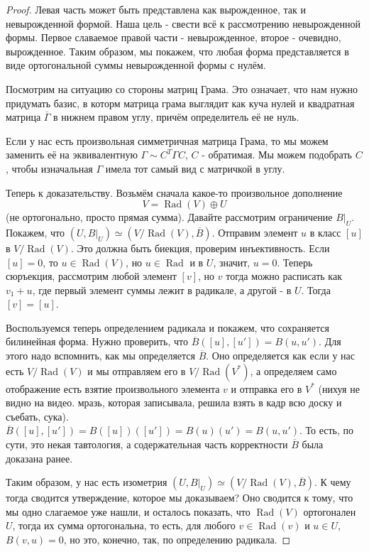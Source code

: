 \documentclass[a4paper,100pt]{article}
\theoremstyle{indented}
\theoremstyle{definition}
\theoremstyle{remark}
\DeclareMathOperator{\Rad}{Rad}
\begin{document}
\begin{proof}
    Левая часть может быть представлена как вырожденное, так и невырожденной формой. Наша цель - свести всё к рассмотрению невырожденной формы. Первое славаемое правой части - невырожденное, второе - очевидно, вырожденное. Таким образом, мы покажем, что любая форма представляется в виде ортогональной суммы невырожденной формы с нулём.

    Посмотрим на ситуацию со стороны матриц Грама. Это означает, что нам нужно придумать базис, в которм матрица грама выглядит как куча нулей и квадратная матрица $\overline{\Gamma}$ в нижнем правом углу, причём определитель её не нуль. \ 

    Если у нас есть произвольная симметричная матрица Грама, то мы можем заменить её на эквивалентную $\Gamma \sim C^T\Gamma C$, $C$ - обратимая. Мы можем подобрать $C$, чтобы изначальная $\Gamma$ имела тот самый вид с матричкой в углу. \ 

    Теперь к доказательству. Возьмём сначала какое-то произвольное дополнение 
    \[
        V = \Rad(V)\oplus U
    \]
    (не ортогонально, просто прямая сумма). Давайте рассмотрим ограничение $B\bigg|_U$. Покажем, что $(U, B\bigg|_U)\simeq (V/\Rad(V), \overline{B})$. Отправим элемент $u$ в класс $[u]$ в $V/\Rad(V)$. Это должна быть биекция, проверим инъективность. Если $[u]=0$, то $u\in\Rad(V)$, но $u\in \Rad$ и в $U$, значит, $u=0$. Теперь сюръекция, рассмотрим любой элемент $[v]$, но $v$ тогда можно расписать как $v_1+u$, где первый элемент суммы лежит в радикале, а другой - в $U$. Тогда $[v]=[u]$. \ 

    Воспользуемся теперь определением радикала и покажем, что сохраняется билинейная форма. Нужно проверить, что $\overline{B}([u], [u'])=B(u, u')$. Для этого надо вспомнить, как мы определяется $\overline{B}$. Оно определяется как если у нас есть $V/\Rad(V)$ и мы отправляем его в $V/\Rad(V^*)$, а определяем само отображение есть взятие произвольного элемента $v$ и отправка его в $V^*$ (нихуя не видно на видео. мразь, которая записывала, решила взять в кадр всю доску и съебать, сука). $\overline{B}([u], [u'])=B([u])([u']) = B(u)(u') = B(u, u')$. То есть, по сути, это некая тавтология, а содержательная часть корректности $\overline{B}$ была доказана ранее. \ 

    Таким образом, у нас есть изометрия $(U, B\bigg|_U)\simeq (V/\Rad(V), \overline{B})$. К чему тогда сводится утверждение, которое мы доказываем? Оно сводится к тому, что мы одно слагаемое уже нашли, и осталось показать, что $\Rad(V)$ ортогонален $U$, тогда их сумма ортогональна, то есть, для любого $v\in \Rad(v)$ и $u\in U$, $B(v, u)=0$, но это, конечно, так, по определению радикала. 
\end{proof}
\end{document}
